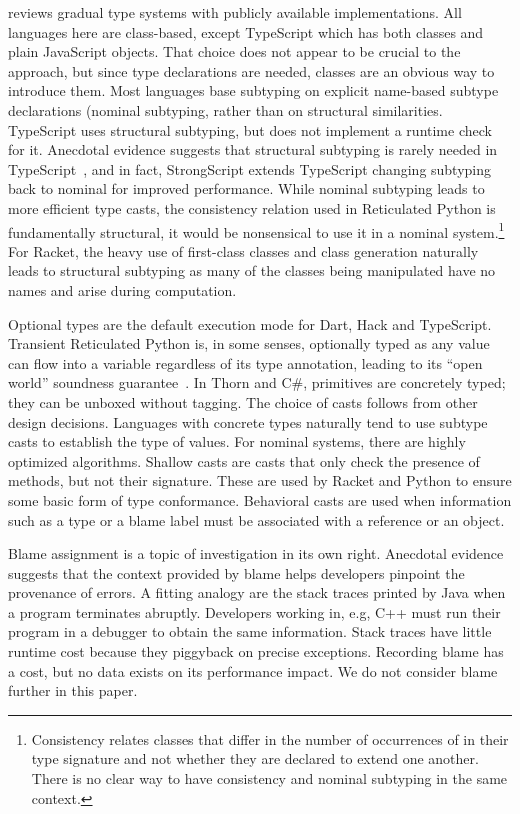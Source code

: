 \documentclass[a4paper,USenglish]{tex/lipics-v2016}
\begin{document}
 reviews gradual type systems with publicly available
implementations. All languages here are class-based, except TypeScript which
has both classes and plain JavaScript objects. That choice does not appear
to be crucial to the approach, but since type declarations are needed,
classes are an obvious way to introduce them.  Most languages base subtyping
on explicit name-based subtype declarations (nominal subtyping, rather than
on structural similarities.  TypeScript uses structural subtyping, but does
not implement a runtime check for it.  Anecdotal evidence suggests that
structural subtyping is rarely needed in TypeScript~\cite{ecoop15}, and in
fact, StrongScript extends TypeScript changing subtyping back to nominal for
improved performance. While nominal subtyping leads to more efficient type
casts, the consistency relation used in Reticulated Python is fundamentally
structural, it would be nonsensical to use it in a nominal
system.\footnote{Consistency relates classes that differ in the number of
  occurrences of \any in their type signature and not whether they are
  declared to extend one another. There is no clear way to have consistency
  and nominal subtyping in the same context.}  For Racket, the heavy use of
first-class classes and class generation naturally leads to structural
subtyping as many of the classes being manipulated have no names and arise
during computation.

Optional types are the default execution mode for Dart, Hack and TypeScript.
Transient Reticulated Python is, in some senses, optionally typed as any
value can flow into a variable regardless of its type annotation, leading to
its ``open world'' soundness guarantee~\cite{siek14}.  In Thorn and C\#,
primitives are concretely typed; they can be unboxed without tagging.  The
choice of casts follows from other design decisions. Languages with concrete
types naturally tend to use subtype casts to establish the type of
values. For nominal systems, there are highly optimized algorithms. Shallow
casts are casts that only check the presence of methods, but not their
signature. These are used by Racket and Python to ensure some basic form of
type conformance. Behavioral casts are used when information such as a type
or a blame label must be associated with a reference or an object.

Blame assignment is a topic of investigation in its own right. Anecdotal
evidence suggests that the context provided by blame helps developers
pinpoint the provenance of errors. A fitting analogy are the stack traces
printed by Java when a program terminates abruptly. Developers working in,
e.g, C++ must run their program in a debugger to obtain the same
information. Stack traces have little runtime cost because they piggyback on
precise exceptions. Recording blame has a cost, but no data exists on its
performance impact. We do not consider blame further in this paper.
\end{document}
